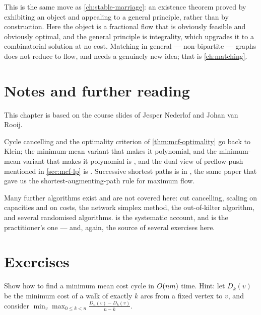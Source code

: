 \begin{intuition}
This is the same move as \cref{ch:stable-marriage}: an existence theorem proved
by exhibiting an object and appealing to a general principle, rather than by
construction. Here the object is a fractional flow that is obviously feasible
and obviously optimal, and the general principle is integrality, which upgrades
it to a combinatorial solution at no cost. Matching in general --- non-bipartite
--- graphs does not reduce to flow, and needs a genuinely new idea; that is
\cref{ch:matching}.
\end{intuition}

\section{Notes and further reading}
\label{sec:mcf-further-reading}

This chapter is based on the course slides of Jesper Nederlof and Johan van
Rooij.

Cycle cancelling and the optimality criterion of \cref{thm:mcf-optimality} go
back to Klein; the minimum-mean variant that makes it polynomial, and the
minimum-mean variant that makes it polynomial is
\citet{GoldbergTarjan1989}, and the dual view of preflow-push mentioned in
\cref{sec:mcf-lp} is \citet{GoldbergTarjan1988}. Successive shortest paths is in
\citet{EdmondsKarp1972}, the same paper that gave us the shortest-augmenting-path
rule for maximum flow.

Many further algorithms exist and are not covered here: cut cancelling, scaling
on capacities and on costs, the network simplex method, the out-of-kilter
algorithm, and several randomised algorithms. \citet[Chapter 12]{Schrijver2003}
is the systematic account, and \citet{AhujaMagnantiOrlin1993} is the
practitioner's one --- and, again, the source of several exercises here.

\section{Exercises}
\label{sec:ex-mcf}

\begin{exercise}
Show how to find a minimum mean cost cycle in $O\!\left(nm\right)$ time. Hint: let
$D_k(v)$ be the minimum cost of a walk of exactly $k$ arcs from a fixed vertex
to $v$, and consider $\min_{v} \max_{0 \le k < n}
\frac{D_n(v)-D_k(v)}{n-k}$.
\end{exercise}

